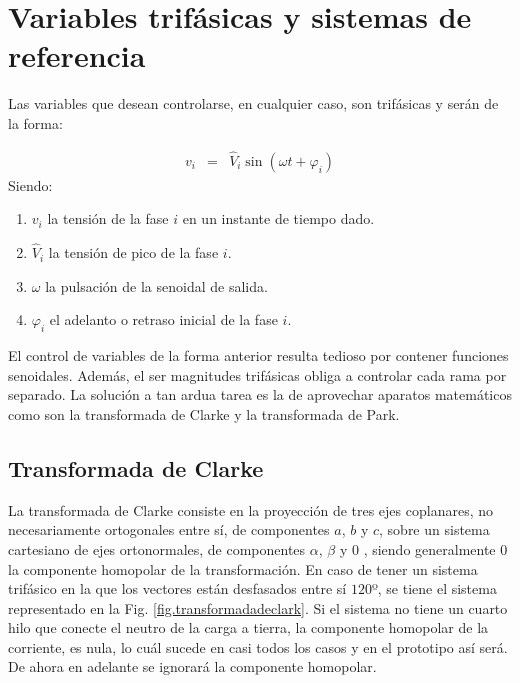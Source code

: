 \documentclass{report}
\begin{document}
\section{Variables trifásicas y sistemas de referencia} \label{sec.controldevariables}

Las variables que desean controlarse, en cualquier caso, son trifásicas y serán de la forma:

\begin{eqnarray}
v_{i} & =  & \hat{V}_{i} \sin (\omega t + \varphi_{i}) \label{eq.generalsen} 
\end{eqnarray}
Siendo:
\begin{enumerate}
\item $v_{i}$ la tensión de la fase $i$ en un instante de tiempo dado.
\item $\hat{V}_{i}$ la tensión de pico de la fase $i$.
\item $\omega $ la pulsación de la senoidal de salida.
\item $\varphi_{i}$ el adelanto o retraso inicial de la fase $i$.
\end{enumerate}

El control de variables de la forma anterior resulta tedioso por contener funciones senoidales. Además, el ser magnitudes trifásicas obliga a controlar cada rama por separado. La solución a tan ardua tarea es la de aprovechar aparatos matemáticos como son la transformada de Clarke y la transformada de Park. 


\subsection{Transformada de Clarke} \label{sec.clarke}
La transformada de Clarke consiste en la proyección de tres ejes coplanares, no necesariamente ortogonales entre sí, de componentes $a$, $b$ y $c$, sobre un sistema cartesiano de ejes ortonormales, de componentes $\alpha$, $\beta$ y $0$ \cite{cincuentaytres}, siendo generalmente $0$ la componente homopolar de la transformación. En caso de tener un sistema trifásico en la que los vectores están desfasados entre sí $120$º, se tiene el sistema representado en la Fig. \ref{fig.transformadadeclark}. Si el sistema no tiene un cuarto hilo que conecte el neutro de la carga a tierra, la componente homopolar de la corriente, es nula, lo cuál sucede en casi todos los casos y en el prototipo así será. De ahora en adelante se ignorará la componente homopolar.
\end{document}
